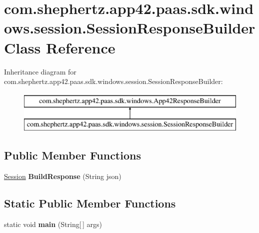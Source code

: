 \hypertarget{classcom_1_1shephertz_1_1app42_1_1paas_1_1sdk_1_1windows_1_1session_1_1_session_response_builder}{\section{com.\+shephertz.\+app42.\+paas.\+sdk.\+windows.\+session.\+Session\+Response\+Builder Class Reference}
\label{classcom_1_1shephertz_1_1app42_1_1paas_1_1sdk_1_1windows_1_1session_1_1_session_response_builder}
}
Inheritance diagram for com.\+shephertz.\+app42.\+paas.\+sdk.\+windows.\+session.\+Session\+Response\+Builder\+:\begin{figure}[H]
\begin{center}
\leavevmode
\includegraphics[height=2.000000cm]{classcom_1_1shephertz_1_1app42_1_1paas_1_1sdk_1_1windows_1_1session_1_1_session_response_builder}
\end{center}
\end{figure}
\subsection*{Public Member Functions}
\begin{DoxyCompactItemize}
\item 
\hypertarget{classcom_1_1shephertz_1_1app42_1_1paas_1_1sdk_1_1windows_1_1session_1_1_session_response_builder_ab60924845dca28f5035ac2b07d959928}{\hyperlink{classcom_1_1shephertz_1_1app42_1_1paas_1_1sdk_1_1windows_1_1session_1_1_session}{Session} {\bfseries Build\+Response} (String json)}\label{classcom_1_1shephertz_1_1app42_1_1paas_1_1sdk_1_1windows_1_1session_1_1_session_response_builder_ab60924845dca28f5035ac2b07d959928}

\end{DoxyCompactItemize}
\subsection*{Static Public Member Functions}
\begin{DoxyCompactItemize}
\item 
\hypertarget{classcom_1_1shephertz_1_1app42_1_1paas_1_1sdk_1_1windows_1_1session_1_1_session_response_builder_a5d010486b6ac04502e3107aaa753d472}{static void {\bfseries main} (String\mbox{[}$\,$\mbox{]} args)}\label{classcom_1_1shephertz_1_1app42_1_1paas_1_1sdk_1_1windows_1_1session_1_1_session_response_builder_a5d010486b6ac04502e3107aaa753d472}

\end{DoxyCompactItemize}
